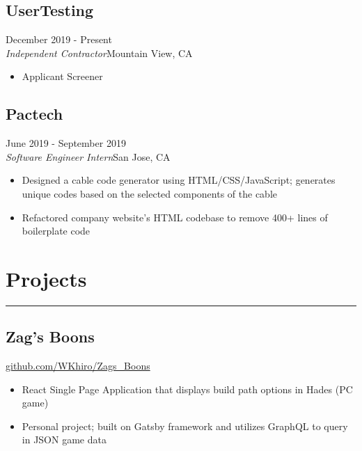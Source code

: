 \documentclass{article}
\begin{document}
\vspace{-1em} 
\subsection{UserTesting}\hfill {\color{NavyBlue}December 2019 - Present\\ {\color{Black}\it Independent Contractor}\hfill Mountain View, CA}%
\begin{itemize}
\itemsep0em 
	\item Applicant Screener
\end{itemize}

\vspace{-1em} 
\subsection{Pactech}\hfill {\color{NavyBlue}June 2019 - September 2019\\ {\color{Black}\it Software Engineer Intern}\hfill San Jose, CA}%
\begin{itemize}
	\itemsep0em
	\item Designed a cable code generator using HTML/CSS/JavaScript; generates unique codes based on the selected components of the cable
	\item Refactored company website's HTML codebase to remove 400+ lines of boilerplate code
\end{itemize}

\vspace{-1em}
\section{Projects}
\vspace{-1.5em}
\par\noindent\rule{\textwidth}{0.4pt}

\vspace{-0.5em}
\subsection{Zag's Boons} \href{https://github.com/WKhiro/Zags_Boons}{\color{NavyBlue} github.com/WKhiro/Zags\_Boons}
\begin{itemize}
\vspace{-0.25em}
	\itemsep0em
	\item React Single Page Application that displays build path options in Hades (PC game)
	\item Personal project; built on Gatsby framework and utilizes GraphQL to query in JSON game data
\end{itemize}
\end{document}
